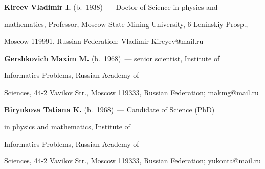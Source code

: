 \textbf{Kireev Vladimir I.} (b.\ 1938)~--- Doctor of Science in physics and 


mathematics, Professor, Moscow State Mining University, 6 Leninskiy Prosp.,


Moscow 119991, Russian Federation; Vladimir-Kireyev@mail.ru





\vspace*{2pt}





\noindent


\textbf{Gershkovich Maxim M.} (b.\ 1968)~--- senior scientist, Institute of 


Informatics Problems, Russian Academy of


Sciences, 44-2 Vavilov Str., Moscow 119333, Russian Federation; makmg@mail.ru





\vspace*{2pt}





\noindent


\textbf{Biryukova Tatiana K.} (b.\ 1968)~--- Candidate of Science (PhD)


in physics and mathematics, Institute of 


Informatics Problems, Russian Academy of


Sciences, 44-2 Vavilov Str., Moscow 119333, Russian Federation; yukonta@mail.ru











 \label{end\stat}


 


\renewcommand{\bibname}{\protect\rm Литература}



